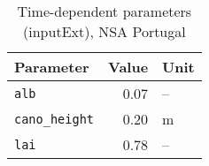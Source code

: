 \begin{table}[ht]
\centering
\caption{Time-dependent parameters (\textsf{inputExt}), NSA Portugal} 
\label{tab:portugalNSA_inputExt}
\begin{tabular}{lrl}
  \hline
Parameter & Value & Unit \\ 
  \hline
\verb!alb! & 0.07 & -- \\ 
  \verb!cano_height! & 0.20 & m \\ 
  \verb!lai! & 0.78 & -- \\ 
   \hline
\end{tabular}
\end{table}
